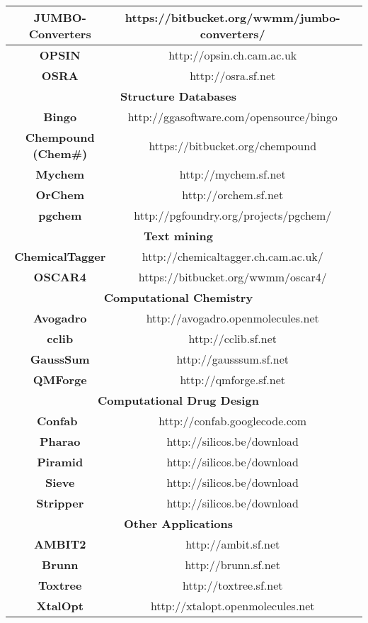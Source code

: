 \documentclass[10pt]{bmc_article}
\newenvironment{bmcformat}{\begin{raggedright}\baselineskip20pt\sloppy\setboolean{publ}{false}}{\end{raggedright}\baselineskip20pt\sloppy}
\begin{document}
\begin{bmcformat}
{\begin{tabular}{|c|c|c|}
        \textbf{JUMBO-Converters} & https://bitbucket.org/wwmm/jumbo-converters/ \\ \hline
        \textbf{OPSIN} & http://opsin.ch.cam.ac.uk \\ \hline
        \textbf{OSRA} & http://osra.sf.net \\ \hline
        \multicolumn{2}{|c|}{\textbf{Structure Databases}} \\ \hline
        \textbf{Bingo}  & http://ggasoftware.com/opensource/bingo \\ \hline
        \textbf{Chempound (Chem\#)} & https://bitbucket.org/chempound \\ \hline
        \textbf{Mychem}  & http://mychem.sf.net \\ \hline
        \textbf{OrChem} & http://orchem.sf.net \\ \hline
        \textbf{pgchem}  & http://pgfoundry.org/projects/pgchem/ \\ \hline
        \multicolumn{2}{|c|}{\textbf{Text mining}} \\ \hline
        \textbf{ChemicalTagger} \cite{HawizyEtAl2011} & http://chemicaltagger.ch.cam.ac.uk/ \\ \hline
        \textbf{OSCAR4} & https://bitbucket.org/wwmm/oscar4/ \\ \hline
        \multicolumn{2}{|c|}{\textbf{Computational Chemistry}} \\ \hline
        \textbf{Avogadro} & http://avogadro.openmolecules.net \\ \hline
        \textbf{cclib}  & http://cclib.sf.net \\ \hline
        \textbf{GaussSum}  & http://gausssum.sf.net \\ \hline
        \textbf{QMForge}  & http://qmforge.sf.net \\ \hline
        \multicolumn{2}{|c|}{\textbf{Computational Drug Design}} \\ \hline
        \textbf{Confab}~\cite{Confab} & http://confab.googlecode.com \\ \hline
        \textbf{Pharao} & http://silicos.be/download \\ \hline
        \textbf{Piramid} & http://silicos.be/download \\ \hline
        \textbf{Sieve} & http://silicos.be/download \\ \hline
        \textbf{Stripper} & http://silicos.be/download \\ \hline
        \multicolumn{2}{|c|}{\textbf{Other Applications}} \\ \hline
        \textbf{AMBIT2}  & http://ambit.sf.net \\ \hline
        \textbf{Brunn}  & http://brunn.sf.net \\ \hline
        \textbf{Toxtree}  & http://toxtree.sf.net \\ \hline
        \textbf{XtalOpt}  & http://xtalopt.openmolecules.net \\ \hline
        \hline
       \end{tabular}
      }


\end{bmcformat}
\end{document}

